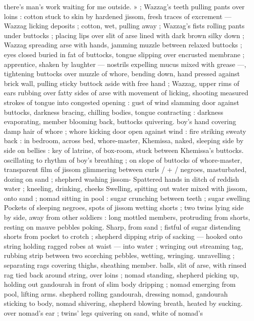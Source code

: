 there's man’s work waiting for me outside. » ; Wazzag's teeth pulling
pants over loins : cotton stuck to skin by hardened jissom, fresh
traces of excrement --- Wazzag licking deposits ; cotton, wet, pulling
away ; Wazzag's fists rolling pants under buttocks ; placing lips over
slit of arse lined with dark brown silky down ; Wazzag spreading arse
with hands, jamming muzzle between relaxed buttocks ; eyes closed
buried in fat of buttocks, tongue slipping over encrusted membrane
; apprentice, shaken by laughter --- nostrils expelling mucus mixed
with grease ---, tightening buttocks over muzzle of whore, bending
down, hand pressed against brick wall, pulling sticky buttock aside
with free hand ; Wazzag, upper rims of ears rubbing over fatty sides
of arse with movement of licking, shooting measured strokes of
tongue into congested opening : gust of wind slamming door against
buttocks, darkness bracing, chilling bodies, tongue contracting :
darkness evaporating, member blooming back, buttocks quivering.
boy's hand covering damp hair of whore ; whore kicking door open
against wind : fire striking sweaty back : in bedroom, across bed,
whore-master, Khemissa, naked, sleeping side by side on bellies :
key of latrine, of box-room, stuck between Khemissa’s buttocks.
oscillating to rhythm of boy's breathing ; on slope of buttocks of
whore-master, transparent film of jissom glimmering between curls /
+ / negroes, masturbated, dozing on sand ; shepherd washing jissom-
Spattered hands in ditch of reddish water ; kneeling, drinking, cheeks
Swelling, spitting out water mixed with jissom, onto sand ; nomad
sitting in pool : sugar crunching between teeth ; sugar swelling
Pockets of sleeping negroes, spots of jissom wetting shorts ; two
twins lying side by side, away from other soldiers : long mottled
members, protruding from shorts, resting on mauve pebbles poking.
Sharp, from sand ; fistful of sugar distending shorts from pocket to
crotch ; shepherd dipping strip of sacking --- hooked onto string
holding ragged robes at waist --- into water ; wringing out streaming
tag, rubbing strip between two scorching pebbles, wetting, wringing.
unravelling ; separating rags covering thighs, sheathing member.
balls, slit of arse, with rinsed rag tied back around string, over loins
; nomad standing, shepherd picking up, holding out gandourah in
front of slim body dripping ; nomad emerging from pool, lifting arms.
shepherd rolling gandourah, dressing nomad, gandourah sticking to
body, nomad shivering, shepherd blowing breath, heated by sucking.
over nomad's ear ; twins’ legs quivering on sand, white of nomad's
